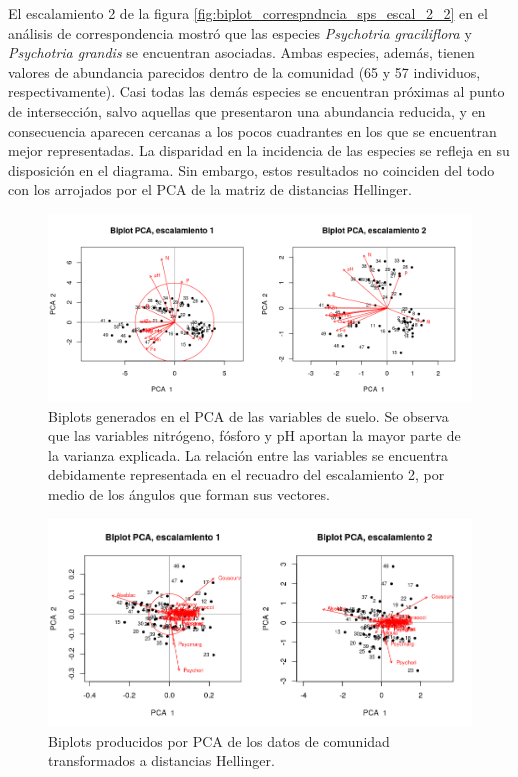 \documentclass[11pt,]{article}
\begin{document}
El escalamiento 2 de la figura
\ref{fig:biplot_correspndncia_sps_escal_2_2} en el análisis de
correspondencia mostró que las especies \emph{Psychotria graciliflora} y
\emph{Psychotria grandis} se encuentran asociadas. Ambas especies,
además, tienen valores de abundancia parecidos dentro de la comunidad
(65 y 57 individuos, respectivamente). Casi todas las demás especies se
encuentran próximas al punto de intersección, salvo aquellas que
presentaron una abundancia reducida, y en consecuencia aparecen cercanas
a los pocos cuadrantes en los que se encuentran mejor representadas. La
disparidad en la incidencia de las especies se refleja en su disposición
en el diagrama. Sin embargo, estos resultados no coinciden del todo con
los arrojados por el PCA de la matriz de distancias Hellinger.

\begin{figure}
\centering
\includegraphics{pca_biplot_suelo.png}
\caption{Biplots generados en el PCA de las variables de suelo. Se
observa que las variables nitrógeno, fósforo y pH aportan la mayor parte
de la varianza explicada. La relación entre las variables se encuentra
debidamente representada en el recuadro del escalamiento 2, por medio de
los ángulos que forman sus vectores. \label{fig:pca_biplot_suelo}}
\end{figure}

\begin{figure}
\centering
\includegraphics{pca_biplot_sps.png}
\caption{Biplots producidos por PCA de los datos de comunidad
transformados a distancias Hellinger. \label{fig:pca_biplot_sps}}
\end{figure}
\end{document}

